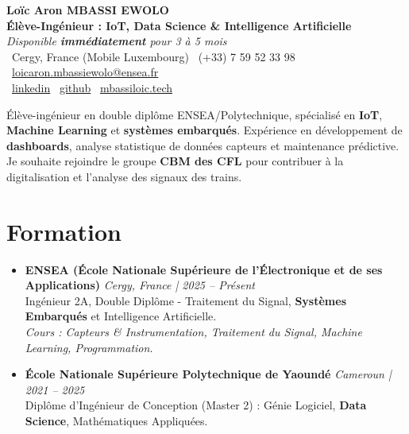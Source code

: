 \documentclass[a4paper,11pt]{article}
\begin{document}
\begin{center}
    {\Large \textbf{Loïc Aron MBASSI EWOLO}} \\ \vspace{4pt}
    \textbf{\large Élève-Ingénieur : IoT, Data Science \& Intelligence Artificielle} \\
    \textit{\small Disponible \textbf{immédiatement} pour 3 à 5 mois} \\ \vspace{4pt}
    \small
    \faMapMarker\ Cergy, France (Mobile Luxembourg) \quad
    \faPhone\ (+33) 7 59 52 33 98 \quad
    \faEnvelope\ \href{mailto:loicaron.mbassiewolo@ensea.fr}{loicaron.mbassiewolo@ensea.fr} \\ \vspace{2pt}
    \faLinkedin\ \href{https://www.linkedin.com/in/loic-aron-mbassi-ewolo-3942a9246/}{linkedin} \quad
    \faGithub\ \href{https://github.com/Nameless0l}{github} \quad
    \faGlobe\ \href{https://mbassiloic.tech}{mbassiloic.tech}
\end{center}

\vspace{-6pt}

\noindent\small{Élève-ingénieur en double diplôme ENSEA/Polytechnique, spécialisé en \textbf{IoT}, \textbf{Machine Learning} et \textbf{systèmes embarqués}. Expérience en développement de \textbf{dashboards}, analyse statistique de données capteurs et maintenance prédictive. Je souhaite rejoindre le groupe \textbf{CBM des CFL} pour contribuer à la digitalisation et l'analyse des signaux des trains.}

\section{Formation}
\begin{itemize}[leftmargin=*, label={.}, nosep]
    \item \textbf{ENSEA (École Nationale Supérieure de l'Électronique et de ses Applications)} \hfill \textit{Cergy, France | 2025 -- Présent} \\
    \small{Ingénieur 2A, Double Diplôme - Traitement du Signal, \textbf{Systèmes Embarqués} et Intelligence Artificielle.} \\
    \textit{\small{Cours : Capteurs \& Instrumentation, Traitement du Signal, Machine Learning, Programmation.}}
    \vspace{2pt}
    \item \textbf{École Nationale Supérieure Polytechnique de Yaoundé} \hfill \textit{Cameroun | 2021 -- 2025} \\
    \small{Diplôme d'Ingénieur de Conception (Master 2) : Génie Logiciel, \textbf{Data Science}, Mathématiques Appliquées.}
\end{itemize}
\end{document}
